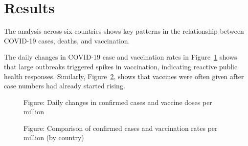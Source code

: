 \documentclass[
  11pt,
]{article}
\begin{document}
\section{Results}\label{sec-results}

The analysis across six countries shows key patterns in the relationship
between COVID-19 cases, deaths, and vaccination.

The daily changes in COVID-19 case and vaccination rates in
Figure~\ref{fig-daily-change} shows that large outbreaks triggered
spikes in vaccination, indicating reactive public health responses.
Similarly, Figure~\ref{fig-vacc-vs-case}, shows that vaccines were often
given after case numbers had already started rising.

\begin{figure}


\caption{\label{fig-daily-change}Figure: Daily changes in confirmed
cases and vaccine doses per million}

\end{figure}%

\begin{figure}


\caption{\label{fig-vacc-vs-case}Figure: Comparison of confirmed cases
and vaccination rates per million (by country)}

\end{figure}%
\end{document}
